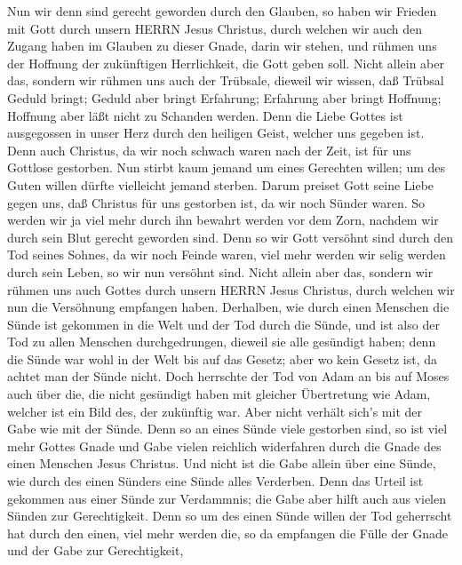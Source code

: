  Nun wir denn sind gerecht geworden durch den Glauben, so
haben wir Frieden mit Gott durch unsern HERRN Jesus Christus,
 durch welchen wir auch den Zugang haben im Glauben zu
dieser Gnade, darin wir stehen, und rühmen uns der Hoffnung der
zukünftigen Herrlichkeit, die Gott geben soll.  Nicht allein
aber das, sondern wir rühmen uns auch der Trübsale, dieweil wir wissen,
daß Trübsal Geduld bringt;  Geduld aber bringt Erfahrung;
Erfahrung aber bringt Hoffnung;  Hoffnung aber läßt nicht zu
Schanden werden. Denn die Liebe Gottes ist ausgegossen in unser Herz
durch den heiligen Geist, welcher uns gegeben ist.  Denn
auch Christus, da wir noch schwach waren nach der Zeit, ist für uns
Gottlose gestorben.  Nun stirbt kaum jemand um eines
Gerechten willen; um des Guten willen dürfte vielleicht jemand sterben.
 Darum preiset Gott seine Liebe gegen uns, daß Christus für
uns gestorben ist, da wir noch Sünder waren.  So werden wir
ja viel mehr durch ihn bewahrt werden vor dem Zorn, nachdem wir durch
sein Blut gerecht geworden sind.  Denn so wir Gott versöhnt
sind durch den Tod seines Sohnes, da wir noch Feinde waren, viel mehr
werden wir selig werden durch sein Leben, so wir nun versöhnt sind.
 Nicht allein aber das, sondern wir rühmen uns auch Gottes
durch unsern HERRN Jesus Christus, durch welchen wir nun die Versöhnung
empfangen haben.  Derhalben, wie durch einen Menschen die
Sünde ist gekommen in die Welt und der Tod durch die Sünde, und ist also
der Tod zu allen Menschen durchgedrungen, dieweil sie alle gesündigt
haben;  denn die Sünde war wohl in der Welt bis auf das
Gesetz; aber wo kein Gesetz ist, da achtet man der Sünde nicht.
 Doch herrschte der Tod von Adam an bis auf Moses auch über
die, die nicht gesündigt haben mit gleicher Übertretung wie Adam,
welcher ist ein Bild des, der zukünftig war.  Aber nicht
verhält sich's mit der Gabe wie mit der Sünde. Denn so an eines Sünde
viele gestorben sind, so ist viel mehr Gottes Gnade und Gabe vielen
reichlich widerfahren durch die Gnade des einen Menschen Jesus Christus.
 Und nicht ist die Gabe allein über eine Sünde, wie durch
des einen Sünders eine Sünde alles Verderben. Denn das Urteil ist
gekommen aus einer Sünde zur Verdammnis; die Gabe aber hilft auch aus
vielen Sünden zur Gerechtigkeit.  Denn so um des einen
Sünde willen der Tod geherrscht hat durch den einen, viel mehr werden
die, so da empfangen die Fülle der Gnade und der Gabe zur Gerechtigkeit,
